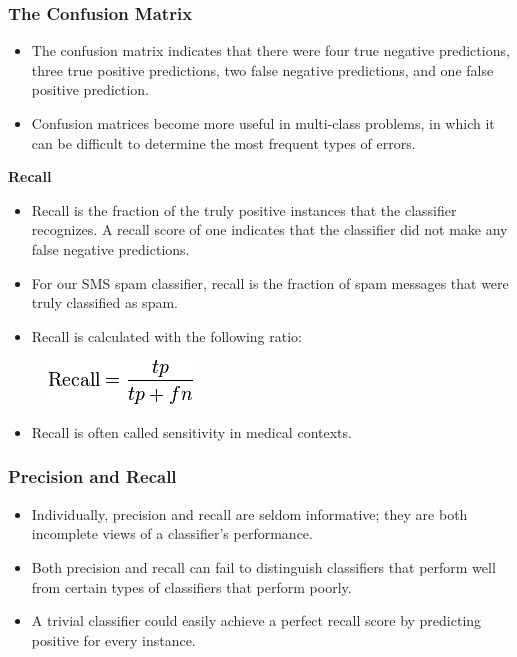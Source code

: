 \documentclass[PredictiveAnalytics101.tex]{subfiles}
\begin{document}
\begin{frame}
	\frametitle{The Confusion Matrix}
	\begin{itemize}
		\item The confusion matrix indicates that there were four true negative predictions, three
		true positive predictions, two false negative predictions, and one false positive
		prediction. 
		\item Confusion matrices become more useful in multi-class problems, in
		which it can be difficult to determine the most frequent types of errors.
	\end{itemize}
	
\end{frame}
\begin{frame}
	\textbf{Recall}
\begin{itemize}
\item   Recall is the fraction of the truly
positive instances that the classifier recognizes. A recall score of one indicates
that the classifier did not make any false negative predictions. 

\item For our SMS spam
classifier, recall is the fraction of spam messages that were truly classified as spam.
\item Recall is calculated with the following ratio:
\end{itemize}

\begin{figure}
\centering
\includegraphics[width=0.37\linewidth]{images/recall}

\end{figure}
\begin{itemize}
\item Recall is often called sensitivity in medical contexts.
\end{itemize}

\end{frame}
\begin{frame}
\frametitle{Precision and Recall}
	\Large
\begin{itemize}
\item Individually, precision and recall are seldom informative; they are both incomplete
views of a classifier's performance. 
\item Both precision and recall can fail to distinguish
classifiers that perform well from certain types of classifiers that perform poorly.
\item A
trivial classifier could easily achieve a perfect recall score by predicting positive for
every instance.
\end{itemize}
 
\end{frame}
\end{document}
